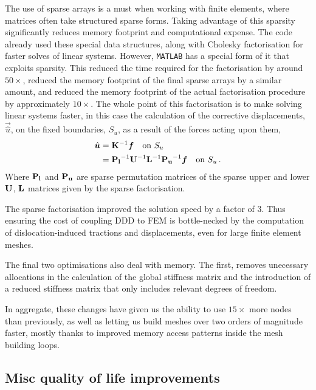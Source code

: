 The use of sparse arrays is a must when working with finite elements, where matrices often take structured sparse forms. Taking advantage of this sparsity significantly reduces memory footprint and computational expense. The code already used these special data structures, along with Cholesky factorisation for faster solves of linear systems. However, \texttt{MATLAB} has a special form of it that exploits sparsity. This reduced the time required for the factorisation by around $50\times$, reduced the memory footprint of the final sparse arrays by a similar amount, and reduced the memory footprint of the actual factorisation procedure by approximately $10 \times$. The whole point of this factorisation is to make solving linear systems faster, in this case the calculation of the corrective displacements, $\vec{\hat{u}}$, on the fixed boundaries, $S_u$, as a result of the forces acting upon them,
\begin{align}
  \vec{\hat{u}} & = \mtx{K}^{-1} \vec{f}\quad \text{on } S_u                                               \\
                & = \mtx{P_l}^{-1} \mtx{U}^{-1} \mtx{L}^{-1} \mtx{P_u}^{-1} \vec{f}\quad \text{on } S_u\,.
\end{align}
Where $\mathbf{P_l}$ and $\mathbf{P_u}$ are sparse permutation matrices of the sparse upper and lower $\mathbf{U}$, $\mathbf{L}$ matrices given by the sparse factorisation.

The sparse factorisation improved the solution speed by a factor of 3. Thus ensuring the cost of coupling DDD to FEM is bottle-necked by the computation of dislocation-induced tractions and displacements, even for large finite element meshes.

The final two optimisations also deal with memory. The first, removes unecessary allocations in the calculation of the global stiffness matrix and the introduction of a reduced stiffness matrix that only includes relevant degrees of freedom.

In aggregate, these changes have given us the ability to use $15 \times$ more nodes than previously, as well as letting us build meshes over two orders of magnitude faster, mostly thanks to improved memory access patterns inside the mesh building loops.

\subsection{Misc quality of life improvements}\label{ss:qol}

